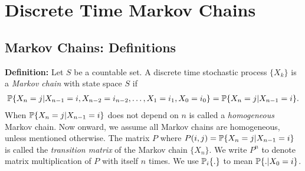 \documentclass[all-lectures.tex]{subfiles}
\begin{document}

\chapter{Discrete Time Markov Chains}
\setcounter{section}{0}
\setcounter{subsection}{0}

\section*{}
\section{Markov Chains: Definitions}
\textbf{Definition:}
Let $S$ be a countable set. A discrete time stochastic process  $\{X_k\}$ is a \textit{Markov chain} with state space $S$ if 
\begin{align*}
\P\{X_n = j|X_{n-1} = i, X_{n-2} = i_{n-2},\dots,X_1 = i_1,X_0 = i_0\} = \P\{X_n = j|X_{n-1} = i\}.
\end{align*}
When $\P\{X_n = j|X_{n-1} = i\}$ does not depend on $n$ is called a \textit{homogeneous }Markov chain. Now onward, we assume all Markov chains are homogeneous, unless mentioned otherwise. The matrix $P$ where $P(i,j) = \P\{X_n = j|X_{n-1} = i\}$ is called the \textit{transition matrix }of the Markov chain $\{X_n\}$. We write $P^n$ to denote matrix multiplication of $P$ with itself $n$ times. We use $\P_i\{.\}$ to mean $\P\{.|X_0 = i\}$. \\
\end{document}
